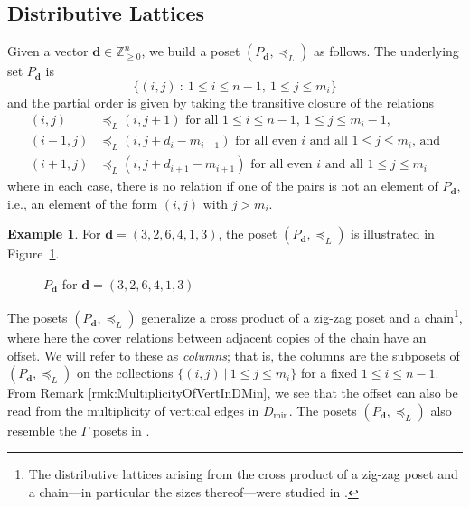 \documentclass{amsart}
\theoremstyle{definition}
\newtheorem{example}[theorem]{Example}
\begin{document}
\subsection{Distributive Lattices}

Given a vector $\mathbf{d} \in \mathbb{Z}_{\geq 0}^n$, we build a poset $(P_{\mathbf{d}},\preceq_L)$ as follows. The underlying set $P_{\mathbf{d}}$ is \[
\{(i,j)~:~1 \leq i \leq n-1,~1 \leq j \leq m_i\}
\]
and the partial order is given by taking the transitive closure of the relations
\begin{align*}
    (i,j)&\preceq_L(i,j+1) \text{ for all }1 \leq i \leq n-1,~1 \leq j \leq m_i-1,\\
    (i-1,j)&\preceq_L(i,j+d_i-m_{i-1}) \text{ for all even }i \text{ and all } 1 \leq j \leq m_i\text{, and}\\
    (i+1,j)&\preceq_L(i,j+d_{i+1}-m_{i+1}) \text{ for all even }i \text{ and all } 1 \leq j \leq m_i
\end{align*}
where in each case, there is no relation if one of the pairs is not an element of $P_{\mathbf{d}}$, i.e., an element of the form $(i,j)$ with $j > m_i$.

\begin{example}
For $\mathbf{d} = (3,2,6,4,1,3)$, the poset $(P_{\mathbf{d}},\preceq_L)$ is illustrated in Figure~\ref{fig:Pd}. 

\begin{figure}[h]
    \centering
    \caption{$P_{\mathbf{d}}$ for $\mathbf{d} = (3,2,6,4,1,3)$}
    \label{fig:Pd}
\end{figure}
\end{example}

The posets $(P_{\mathbf{d}},\preceq_L)$ generalize a cross product of a zig-zag poset and a chain\footnote{The distributive lattices arising from the cross product of a zig-zag poset and a chain---in particular the sizes thereof---were studied in \cite{berman76}.}, where here the cover relations between adjacent copies of the chain have an offset.  We will refer to these as \emph{columns}; that is, the columns are the subposets of $(P_{\mathbf{d}},\preceq_L)$ on the collections $\{(i,j)~|~1\le j\le m_i\}$ for a fixed $1\le i\le n-1$. From Remark \ref{rmk:MultiplicityOfVertInDMin}, we see that the offset can also be read from the multiplicity of vertical edges in $D_{\min}$.
The posets $(P_{\mathbf{d}},\preceq_L)$ also resemble the $\Gamma$ posets in \cite{dilks2019rowmotion}.
\end{document}
